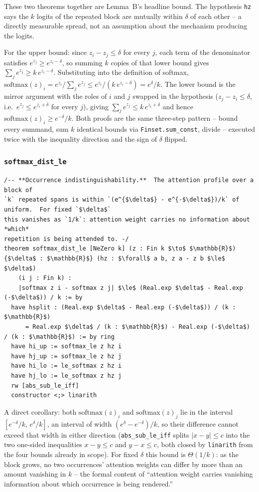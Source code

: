 \documentclass[11pt]{article}
\begin{document}
These two theorems together are Lemma~B's headline bound. The hypothesis
\texttt{hz} says the $k$ logits of the repeated block are mutually within
$\delta$ of each other -- a directly measurable spread, not an assumption
about the mechanism producing the logits.

For the upper bound: since $z_i - z_j \le \delta$ for every $j$, each term
of the denominator satisfies $e^{z_j} \ge e^{z_i-\delta}$, so summing $k$
copies of that lower bound gives $\sum_j e^{z_j} \ge k\, e^{z_i-\delta}$.
Substituting into the definition of softmax,
$\mathrm{softmax}(z)_i = e^{z_i}/\sum_j e^{z_j} \le e^{z_i}/(k\,e^{z_i-\delta})
= e^{\delta}/k$. The lower bound is the mirror argument with the roles of
$i$ and $j$ swapped in the hypothesis ($z_j - z_i \le \delta$, i.e.\
$e^{z_j}\le e^{z_i+\delta}$ for every $j$), giving $\sum_j e^{z_j} \le k\,
e^{z_i+\delta}$ and hence $\mathrm{softmax}(z)_i \ge e^{-\delta}/k$. Both
proofs are the same three-step pattern -- bound every summand, sum $k$
identical bounds via \texttt{Finset.sum\_const}, divide -- executed twice with
the inequality direction and the sign of $\delta$ flipped.

\subsubsection*{\texttt{softmax\_dist\_le}}

\begin{lstlisting}
/-- **Occurrence indistinguishability.**  The attention profile over a block of
`k` repeated spans is within `(e^{$\delta$} - e^{-$\delta$})/k` of uniform.  For fixed `$\delta$`
this vanishes as `1/k`: attention weight carries no information about *which*
repetition is being attended to. -/
theorem softmax_dist_le [NeZero k] (z : Fin k $\to$ $\mathbb{R}$) {$\delta$ : $\mathbb{R}$} (hz : $\forall$ a b, z a - z b $\le$ $\delta$)
    (i j : Fin k) :
    |softmax z i - softmax z j| $\le$ (Real.exp $\delta$ - Real.exp (-$\delta$)) / k := by
  have hsplit : (Real.exp $\delta$ - Real.exp (-$\delta$)) / (k : $\mathbb{R}$)
      = Real.exp $\delta$ / (k : $\mathbb{R}$) - Real.exp (-$\delta$) / (k : $\mathbb{R}$) := by ring
  have hi_up := softmax_le z hz i
  have hj_up := softmax_le z hz j
  have hi_lo := le_softmax z hz i
  have hj_lo := le_softmax z hz j
  rw [abs_sub_le_iff]
  constructor <;> linarith
\end{lstlisting}

A direct corollary: both $\mathrm{softmax}(z)_i$ and $\mathrm{softmax}(z)_j$
lie in the interval $[e^{-\delta}/k,\,e^{\delta}/k]$, an interval of width
$(e^{\delta}-e^{-\delta})/k$, so their difference cannot exceed that width in
either direction (\texttt{abs\_sub\_le\_iff} splits $|x-y|\le c$ into the two
one-sided inequalities $x-y\le c$ and $y-x\le c$, both closed by
\texttt{linarith} from the four bounds already in scope). For fixed $\delta$
this bound is $\Theta(1/k)$: as the block grows, no two occurrences' attention
weights can differ by more than an amount vanishing in $k$ -- the formal
content of ``attention weight carries vanishing information about which
occurrence is being rendered.''
\end{document}
